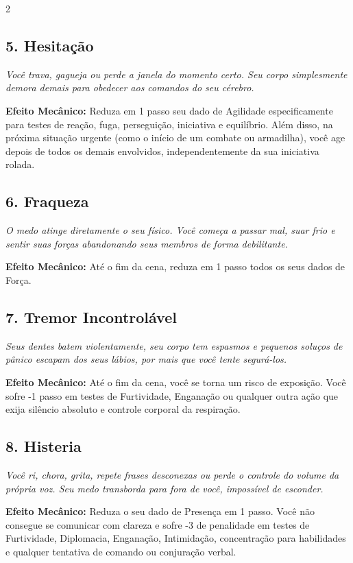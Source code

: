 \documentclass[a4paper,11pt,openany]{book}
\begin{document}
\begin{multicols}{2}
\subsection*{5. Hesitação}
\textit{Você trava, gagueja ou perde a janela do momento certo. Seu corpo simplesmente demora demais para obedecer aos comandos do seu cérebro.}

\textbf{Efeito Mecânico:} Reduza em 1 passo seu dado de Agilidade especificamente para testes de reação, fuga, perseguição, iniciativa e equilíbrio. Além disso, na próxima situação urgente (como o início de um combate ou armadilha), você age depois de todos os demais envolvidos, independentemente da sua iniciativa rolada.

\subsection*{6. Fraqueza}
\textit{O medo atinge diretamente o seu físico. Você começa a passar mal, suar frio e sentir suas forças abandonando seus membros de forma debilitante.}

\textbf{Efeito Mecânico:} Até o fim da cena, reduza em 1 passo todos os seus dados de Força.

\subsection*{7. Tremor Incontrolável}
\textit{Seus dentes batem violentamente, seu corpo tem espasmos e pequenos soluços de pânico escapam dos seus lábios, por mais que você tente segurá-los.}

\textbf{Efeito Mecânico:} Até o fim da cena, você se torna um risco de exposição. Você sofre -1 passo em testes de Furtividade, Enganação ou qualquer outra ação que exija silêncio absoluto e controle corporal da respiração. 

\subsection*{8. Histeria}
\textit{Você ri, chora, grita, repete frases desconexas ou perde o controle do volume da própria voz. Seu medo transborda para fora de você, impossível de esconder.}

\textbf{Efeito Mecânico:} Reduza o seu dado de Presença em 1 passo. Você não consegue se comunicar com clareza e sofre -3 de penalidade em testes de Furtividade, Diplomacia, Enganação, Intimidação, concentração para habilidades e qualquer tentativa de comando ou conjuração verbal.




\end{multicols}
\end{document}
